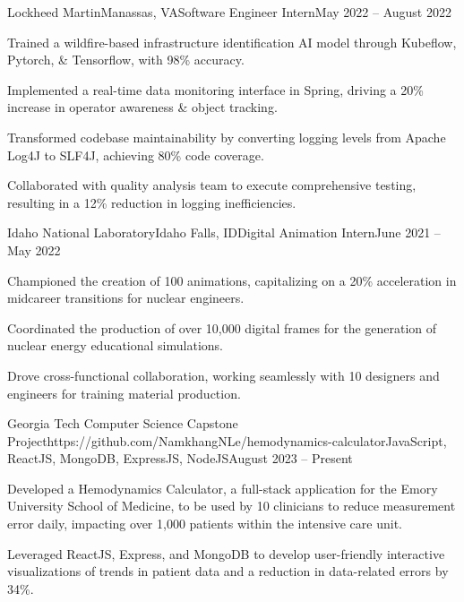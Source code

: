 \documentclass{article}
\begin{document}
\begin{flushleft}
    \begin{experience}{Lockheed Martin}{Manassas, VA}{Software Engineer Intern}{May 2022 -- August 2022}
        \item Trained a wildfire-based infrastructure identification AI model through Kubeflow, Pytorch, \& Tensorflow, with 98\% accuracy.
        \item Implemented a real-time data monitoring interface in Spring, driving a 20\% increase in operator awareness \& object tracking.
        \item Transformed codebase maintainability by converting logging levels from Apache Log4J to SLF4J, achieving 80\% code coverage.
        \item Collaborated with quality analysis team to execute comprehensive testing, resulting in a 12\% reduction in logging inefficiencies.
        
    \end{experience}

    \begin{experience}{Idaho National Laboratory}{Idaho Falls, ID}{Digital Animation Intern}{June 2021 -- May 2022}
        \item Championed the creation of 100 animations, capitalizing on a 20\% acceleration in midcareer transitions for nuclear engineers.
        \item Coordinated the production of over 10,000 digital frames for the generation of nuclear energy educational simulations.
        \item Drove cross-functional collaboration, working seamlessly with 10 designers and engineers for training material production.
    \end{experience}
    


    \vspace{3pt}

    \begin{project}{Georgia Tech Computer Science Capstone Project}{https://github.com/NamkhangNLe/hemodynamics-calculator}{JavaScript, ReactJS, MongoDB, ExpressJS, NodeJS}{August 2023 -- Present}
        \item Developed a Hemodynamics Calculator, a full-stack application for the Emory University School of Medicine, to be used by 10 clinicians to reduce measurement error daily, impacting over 1,000 patients within the intensive care unit.
        \item Leveraged ReactJS, Express, and MongoDB to develop user-friendly interactive visualizations of trends in patient data and a reduction in data-related errors by 34\%.
    \end{project}


\end{flushleft}
\end{document}
